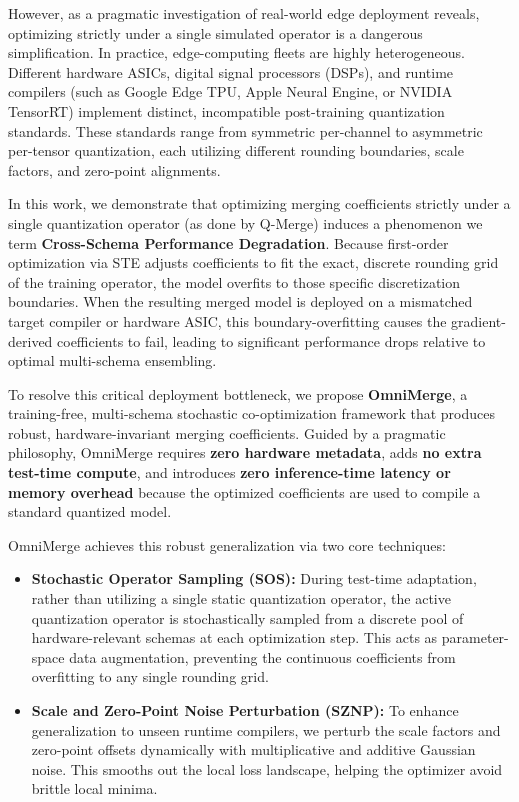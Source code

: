 However, as a pragmatic investigation of real-world edge deployment reveals, optimizing strictly under a single simulated operator is a dangerous simplification. In practice, edge-computing fleets are highly heterogeneous. Different hardware ASICs, digital signal processors (DSPs), and runtime compilers (such as Google Edge TPU, Apple Neural Engine, or NVIDIA TensorRT) implement distinct, incompatible post-training quantization standards. These standards range from symmetric per-channel to asymmetric per-tensor quantization, each utilizing different rounding boundaries, scale factors, and zero-point alignments.

In this work, we demonstrate that optimizing merging coefficients strictly under a single quantization operator (as done by Q-Merge) induces a phenomenon we term \textbf{Cross-Schema Performance Degradation}. Because first-order optimization via STE adjusts coefficients to fit the exact, discrete rounding grid of the training operator, the model overfits to those specific discretization boundaries. When the resulting merged model is deployed on a mismatched target compiler or hardware ASIC, this boundary-overfitting causes the gradient-derived coefficients to fail, leading to significant performance drops relative to optimal multi-schema ensembling.

To resolve this critical deployment bottleneck, we propose \textbf{OmniMerge}, a training-free, multi-schema stochastic co-optimization framework that produces robust, hardware-invariant merging coefficients. Guided by a pragmatic philosophy, OmniMerge requires \textbf{zero hardware metadata}, adds \textbf{no extra test-time compute}, and introduces \textbf{zero inference-time latency or memory overhead} because the optimized coefficients are used to compile a standard quantized model.

OmniMerge achieves this robust generalization via two core techniques:
\begin{itemize}
    \item \textbf{Stochastic Operator Sampling (SOS):} During test-time adaptation, rather than utilizing a single static quantization operator, the active quantization operator is stochastically sampled from a discrete pool of hardware-relevant schemas at each optimization step. This acts as parameter-space data augmentation, preventing the continuous coefficients from overfitting to any single rounding grid.
    \item \textbf{Scale and Zero-Point Noise Perturbation (SZNP):} To enhance generalization to unseen runtime compilers, we perturb the scale factors and zero-point offsets dynamically with multiplicative and additive Gaussian noise. This smooths out the local loss landscape, helping the optimizer avoid brittle local minima.
\end{itemize}

